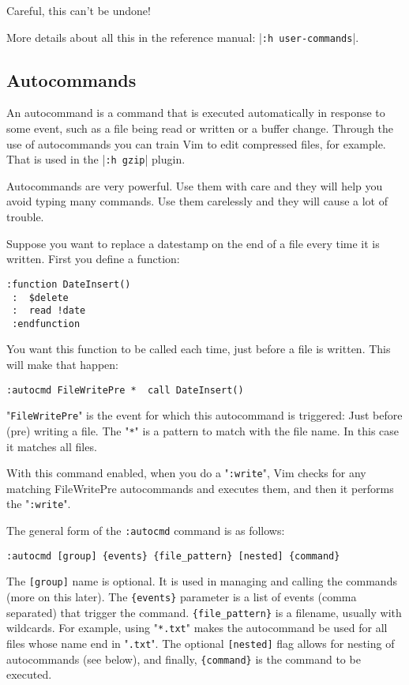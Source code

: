 Careful, this can't be undone!

More details about all this in the reference manual: |\texttt{:h user-commands}|.
\subsection{Autocommands}
\label{Autocommands}
An autocommand is a command that is executed automatically in response to some event, such as a file being read or written or a buffer change.
Through the use of autocommands you can train Vim to edit compressed files, for example.
That is used in the |\texttt{:h gzip}| plugin.

Autocommands are very powerful.
Use them with care and they will help you avoid typing many commands.
Use them carelessly and they will cause a lot of trouble.

Suppose you want to replace a datestamp on the end of a file every time it is written.
First you define a function:

\begin{Verbatim}[samepage=true]
 :function DateInsert()
 :  $delete
 :  read !date
 :endfunction
\end{Verbatim}

You want this function to be called each time, just before a file is written.
This will make that happen:

\begin{Verbatim}[samepage=true]
 :autocmd FileWritePre *  call DateInsert()
\end{Verbatim}

"\texttt{FileWritePre}" is the event for which this autocommand is triggered: Just before (pre) writing a file.
The "\texttt{*}" is a pattern to match with the file name.
In this case it matches all files.

With this command enabled, when you do a "\texttt{:write}", Vim checks for any matching FileWritePre autocommands and executes them, and then it performs the "\texttt{:write}".

The general form of the \texttt{:autocmd} command is as follows:

\begin{Verbatim}[samepage=true]
 :autocmd [group] {events} {file_pattern} [nested] {command}
\end{Verbatim}

The \texttt{[group]} name is optional.
It is used in managing and calling the commands (more on this later).
The \texttt{\{events\}} parameter is a list of events (comma separated) that trigger the command.
\texttt{\{file\_pattern\}} is a filename, usually with wildcards.
For example, using "\texttt{*.txt}" makes the autocommand be used for all files whose name end in "\texttt{.txt}".
The optional \texttt{[nested]} flag allows for nesting of autocommands (see below), and finally, \texttt{\{command\}} is the command to be executed.

